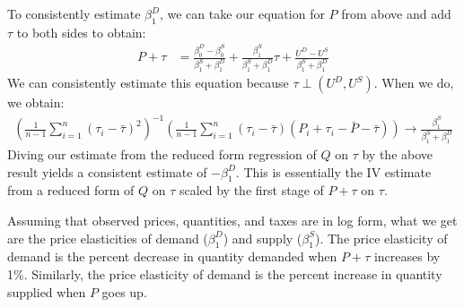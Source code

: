 \documentclass{article}
\begin{document}
\begin{solution}
To consistently estimate $\beta_1^D$, we can take our equation for $P$ from above and add $\tau$ to both sides to obtain:
\begin{align*}
    P + \tau &= \frac{\beta_0^D-\beta_0^S}{\beta_{1}^{S} + \beta_{1}^{D}} 
      + \frac{\beta_1^S}{\beta_{1}^{S} + \beta_{1}^{D}} \tau 
      + \frac{U^D-U^S}{\beta_{1}^{S} + \beta_{1}^{D}}
\end{align*}
We can consistently estimate this equation because $\tau \perp (U^D,U^S)$. When we do, we obtain:
\begin{align*}
    \left( \frac{1}{n-1} \sum_{i=1}^n (\tau_i-\bar{\tau})^2 \right)^{-1} \left( \frac{1}{n-1} \sum_{i=1}^n (\tau_i-\bar{\tau}) (P_i+\tau_i-\bar{P}-\bar{\tau})  \right) \to \frac{\beta_1^S}{\beta_{1}^{S} + \beta_{1}^{D}} \tag{$P+\tau$ on $\tau$}
\end{align*}
Diving our estimate from the reduced form regression of $Q$ on $\tau$ by the above result yields a consistent estimate of $-\beta_1^D$. This is essentially the IV estimate from a reduced form of $Q$ on $\tau$ scaled by the first stage of $P+\tau$ on $\tau$.

Assuming that observed prices, quantities, and taxes are in log form, what we get are the price elasticities of demand ($\beta_1^D$) and supply ($\beta_1^S$). The price elasticity of demand is the percent decrease in quantity demanded when $P+\tau$ increases by 1\%. Similarly, the price elasticity of demand is the percent increase in quantity supplied when $P$ goes up.

\end{solution}
\end{document}
